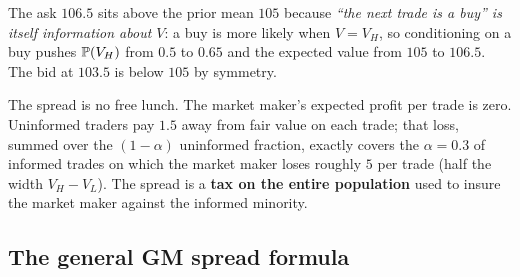 \begin{intuitionbox}
The ask $106.5$ sits above the prior mean $105$ because \emph{``the
next trade is a buy'' is itself information about $V$}: a buy is
more likely when $V = V_H$, so conditioning on a buy pushes
$\mathbb{P}(V_H)$ from $0.5$ to $0.65$ and the expected value from
$105$ to $106.5$. The bid at $103.5$ is below $105$ by symmetry.

The spread is no free lunch. The market maker's expected profit
per trade is zero. Uninformed traders pay $1.5$ away from fair
value on each trade; that loss, summed over the $(1-\alpha)$
uninformed fraction, exactly covers the $\alpha = 0.3$ of informed
trades on which the market maker loses roughly $5$ per trade
(half the width $V_H - V_L$). The spread is a \textbf{tax on the
entire population} used to insure the market maker against the
informed minority.
\end{intuitionbox}

\subsection{The general GM spread formula}
\label{subsec:gm_general}

